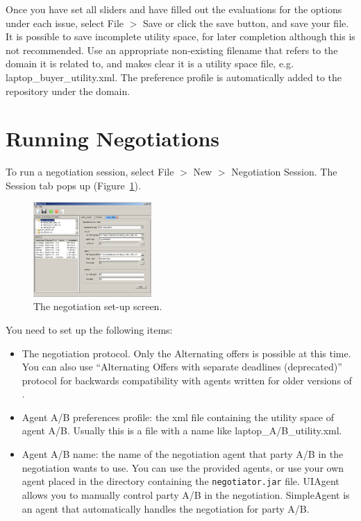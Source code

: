 \documentclass[]{article}
\begin{document}
Once you have set all sliders and have filled out the evaluations for the options under each issue, select File $>$ Save or click the save button, and save your file. It is possible to save incomplete utility space, for later completion although this is not recommended. Use an appropriate non-existing filename that refers to the domain it is related to, and makes clear it is a utility space file, e.g. laptop\_buyer\_utility.xml. The preference profile is automatically added to the repository under the domain.
 
\section{Running Negotiations}
To run a negotiation session, select File $>$ New $>$ Negotiation Session. The Session tab pops up (Figure~\ref{Fig:negotiation set-up}). 

\begin{figure}[htb]
	\centering
	\includegraphics[width=0.4\textwidth]{media/image11.png}
\caption{The negotiation set-up screen.}\label{Fig:negotiation set-up}
\end{figure}

You need to set up the following items:
\begin{itemize}
	\item The negotiation protocol. Only the Alternating offers is possible at this time. You can also use ``Alternating Offers with separate deadlines (deprecated)'' protocol for backwards compatibility with agents written for older versions of \Genius.
	\item Agent A/B preferences profile: the xml file containing the utility space of agent A/B. Usually this is a file with a name like laptop\_A/B\_utility.xml.
	\item Agent A/B name: the name of the negotiation agent that party A/B in the negotiation wants to use. You can use the provided agents, or use your own agent placed in the directory containing the \texttt{negotiator.jar} file. UIAgent allows you to manually control party A/B in the negotiation. SimpleAgent is an agent that automatically handles the negotiation for party A/B.
\end{itemize}
\end{document}

